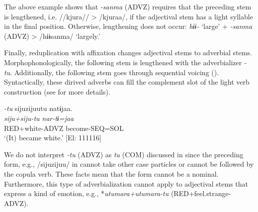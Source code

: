 The above example shows that \textit{{}-sanma} (ADVZ) requires that the preceding stem is lengthened, i.e. //kjura// > /kjuraa/, if the adjectival stem has a light syllable in the final position. Otherwise, lengthening does not occur: \textit{hɨɨ-} ‘large’ + \textit{{}-sanma} (ADVZ) > /hɨɨsanma/ ‘largely.’

  Finally, reduplication with affixation changes adjectival stems to adverbial stems. Morphophonologically, the following stem is lengthened with the adverbializer \textit{{}-tu}. Additionally, the following stem goes through sequential voicing (). Syntactically, these dirived adverbs can fill the complement slot of the light verb construction (see  for more details).

\ea  \textit{{}-tu} \label{ex:4.62}
\glll   sijuzijuutu  natɨjaa.\\
    \textit{siju+siju-tu}  \textit{nar-tɨ=jaa}\\
    RED+white-ADVZ  become-SEQ=SOL\\
    \glt     ‘(It) became white.’ [El: 111116]
\z

We do not interpret \textit{{}-tu} (ADVZ) as \textit{tu} (COM) discussed in  since the preceding form, e.g., /sijuzijuu/ in  cannot take other case particles or cannot be followed by the copula verb. These facts mean that the form cannot be a nominal. Furthermore, this type of adverbialization cannot apply to adjectival stems that express a kind of emotion, e.g., *\textit{utumara+utumara-tu} (RED+feel.strange-ADVZ).
